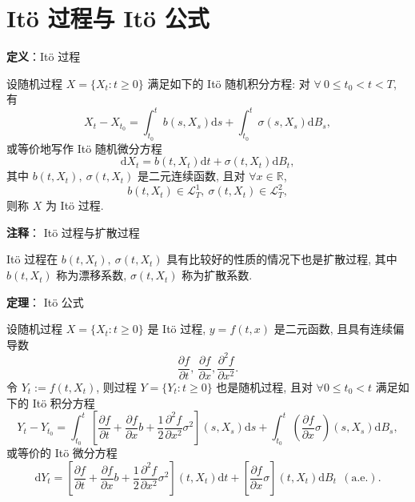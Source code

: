\documentclass[openany]{ctexbook}
\theoremstyle{kaiti}
\theoremstyle{normal}
\begin{document}
\section{It\"o 过程与 It\"o 公式}

\textbf{定义}：It\"o 过程

设随机过程 $X=\{X_t:t\geqslant0\}$ 满足如下的 It\"o 随机积分方程: 对 $\forall~0\leqslant t_0<t<T$, 有
\begin{equation}
  X_t-X_{t_0}=\int_{t_0}^tb(s,X_s)\mathrm{d}s+\int_{t_0}^t\sigma(s,X_s)\mathrm{d}B_s,
\end{equation}
或等价地写作 It\"o 随机微分方程
\begin{equation}
  \mathrm{d}X_t=b(t,X_t)\mathrm{d}t+\sigma(t,X_t)\mathrm{d}B_t,
\end{equation}
其中 $b(t,X_t),~\sigma(t,X_t)$ 是二元连续函数, 且对 $\forall x\in\mathbb{R}$,
\begin{equation}
  b(t,X_t)\in\mathcal{L}_T^1,~ \sigma(t,X_t)\in\mathcal{L}_T^2,
\end{equation}
则称 $X$ 为 It\"o 过程.

\textbf{注释}： It\"o 过程与扩散过程

It\"o 过程在 $b(t,X_t),~\sigma(t,X_t)$ 具有比较好的性质的情况下也是扩散过程, 其中 $b(t,X_t)$ 称为漂移系数, $\sigma(t,X_t)$ 称为扩散系数.

\textbf{定理}： It\"o 公式

设随机过程 $X=\{X_t:t\geqslant0\}$ 是 It\"o 过程, $y=f(t,x)$ 是二元函数, 且具有连续偏导数
\begin{equation}
  \frac{\partial f}{\partial t},~\frac{\partial f}{\partial x},\frac{\partial^2 f}{\partial x^2}.
\end{equation}
令 $Y_t:= f(t,X_t)$, 则过程 $Y=\{Y_t:t\geqslant0\}$ 也是随机过程, 且对 $\forall0\leqslant t_0<t$ 满足如下的 It\"o 积分方程
\begin{equation}
  Y_t-Y_{t_0}=\int_{t_0}^t\left[\frac{\partial f}{\partial t}+\frac{\partial f}{\partial x}b+\frac{1}{2}\frac{\partial^2 f}{\partial x^2}\sigma^2\right](s,X_s)\mathrm{d}s+\int_{t_0}^t\left(\frac{\partial f}{\partial x}\sigma\right)(s,X_s)\mathrm{d}B_s,
\end{equation}
或等价的 It\"o 微分方程
\begin{equation}
  \mathrm{d}Y_t=\left[\frac{\partial f}{\partial t}+\frac{\partial f}{\partial x}b+\frac{1}{2}\frac{\partial^2 f}{\partial x^2}\sigma^2\right](t,X_t)\mathrm{d}t+\left[\frac{\partial f}{\partial x}\sigma\right](t,X_t)\mathrm{d}B_t~~(\text{a.e.}).
\end{equation}
\end{document}
